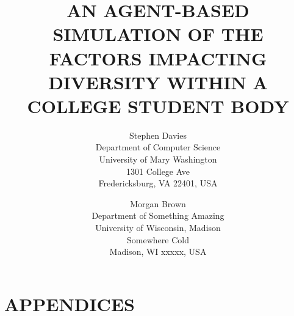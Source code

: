 \documentclass{wscpaperproc}
\begin{document}

\title{AN AGENT-BASED SIMULATION OF THE FACTORS IMPACTING \\DIVERSITY WITHIN A
COLLEGE STUDENT BODY}

\author{Stephen Davies\\ [12pt]
Department of Computer Science \\
University of Mary Washington\\
1301 College Ave \\
Fredericksburg, VA 22401, USA
\and
Morgan Brown\\[12pt]
Department of Something Amazing \\
University of Wisconsin, Madison\\
Somewhere Cold\\
Madison, WI xxxxx, USA \\
}

\maketitle









\appendix

\section{APPENDICES}

\vspace{6pt}





\end{document}
